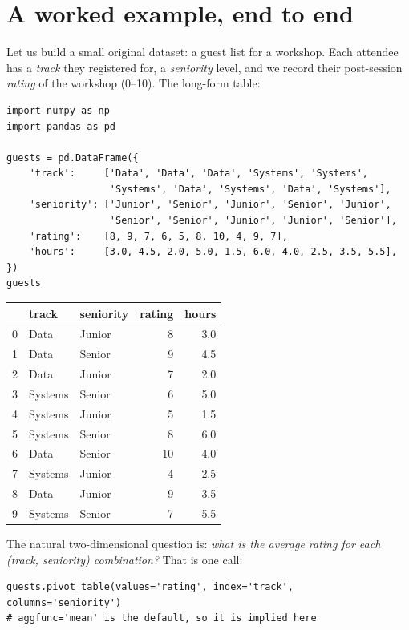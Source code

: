 \documentclass[11pt]{article}
\begin{document}
\section{A worked example, end to end}

Let us build a small original dataset: a guest list for a workshop. Each attendee has a \emph{track} they registered for, a \emph{seniority} level, and we record their post-session \emph{rating} of the workshop (0--10). The long-form table:

\begin{lstlisting}
import numpy as np
import pandas as pd

guests = pd.DataFrame({
    'track':     ['Data', 'Data', 'Data', 'Systems', 'Systems',
                  'Systems', 'Data', 'Systems', 'Data', 'Systems'],
    'seniority': ['Junior', 'Senior', 'Junior', 'Senior', 'Junior',
                  'Senior', 'Senior', 'Junior', 'Junior', 'Senior'],
    'rating':    [8, 9, 7, 6, 5, 8, 10, 4, 9, 7],
    'hours':     [3.0, 4.5, 2.0, 5.0, 1.5, 6.0, 4.0, 2.5, 3.5, 5.5],
})
guests
\end{lstlisting}

\begin{center}
\renewcommand{\arraystretch}{1.1}
\begin{tabular}{r l l r r}
\toprule
 & \textbf{track} & \textbf{seniority} & \textbf{rating} & \textbf{hours} \\
\midrule
0 & Data    & Junior & 8  & 3.0 \\
1 & Data    & Senior & 9  & 4.5 \\
2 & Data    & Junior & 7  & 2.0 \\
3 & Systems & Senior & 6  & 5.0 \\
4 & Systems & Junior & 5  & 1.5 \\
5 & Systems & Senior & 8  & 6.0 \\
6 & Data    & Senior & 10 & 4.0 \\
7 & Systems & Junior & 4  & 2.5 \\
8 & Data    & Junior & 9  & 3.5 \\
9 & Systems & Senior & 7  & 5.5 \\
\bottomrule
\end{tabular}
\end{center}

The natural two-dimensional question is: \emph{what is the average rating for each (track, seniority) combination?} That is one call:

\begin{lstlisting}
guests.pivot_table(values='rating', index='track', columns='seniority')
# aggfunc='mean' is the default, so it is implied here
\end{lstlisting}
\end{document}
